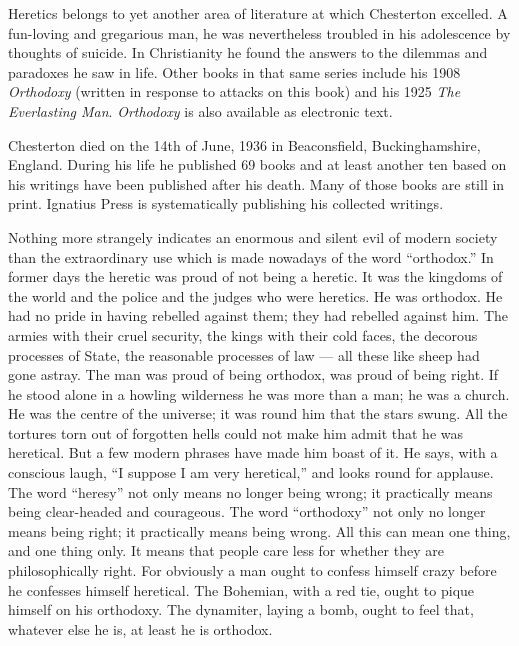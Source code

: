 Heretics belongs to yet another area of literature at which Chesterton excelled. A fun-loving and gregarious man, he was nevertheless troubled in his adolescence by thoughts of suicide. In Christianity he found the answers to the dilemmas and paradoxes he saw in life. Other books in that same series include his 1908 \emph{Orthodoxy} (written in response to attacks on this book) and his 1925 \emph{The Everlasting Man}. \emph{Orthodoxy} is also available as electronic text.

Chesterton died on the 14th of June, 1936 in Beaconsfield, Buckinghamshire, England. During his life he published 69 books and at least another ten based on his writings have been published after his death. Many of those books are still in print. Ignatius Press is systematically publishing his collected writings.


Nothing more strangely indicates an enormous and silent evil of modern society than the extraordinary use which is made nowadays of the word “orthodox.” In former days the heretic was proud of not being a heretic. It was the kingdoms of the world and the police and the judges who were heretics. He was orthodox. He had no pride in having rebelled against them; they had rebelled against him. The armies with their cruel security, the kings with their cold faces, the decorous processes of State, the reasonable processes of law — all these like sheep had gone astray. The man was proud of being orthodox, was proud of being right. If he stood alone in a howling wilderness he was more than a man; he was a church. He was the centre of the universe; it was round him that the stars swung. All the tortures torn out of forgotten hells could not make him admit that he was heretical. But a few modern phrases have made him boast of it. He says, with a conscious laugh, “I suppose I am very heretical,” and looks round for applause. The word “heresy” not only means no longer being wrong; it practically means being clear-headed and courageous. The word “orthodoxy” not only no longer means being right; it practically means being wrong. All this can mean one thing, and one thing only. It means that people care less for whether they are philosophically right. For obviously a man ought to confess himself crazy before he confesses himself heretical. The Bohemian, with a red tie, ought to pique himself on his orthodoxy. The dynamiter, laying a bomb, ought to feel that, whatever else he is, at least he is orthodox.


